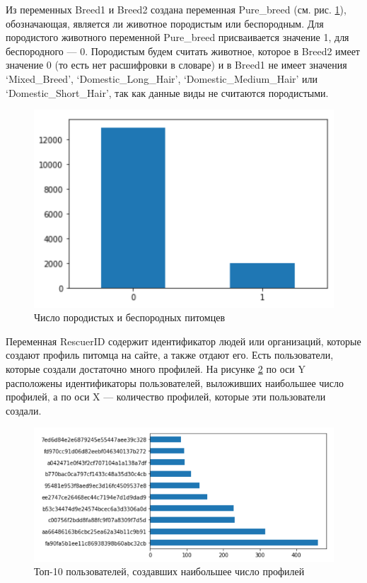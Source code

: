 \documentclass[14pt]{mmcs_article}
\begin{document}
Из переменных Breed1 и Breed2 создана переменная Pure\_breed (см. рис. \ref{analyse:purebreed}), обозначающая, является ли животное породистым или беспородным. Для породистого животного переменной Pure\_breed присваивается значение 1, для беспородного --- 0. Породистым будем считать животное, которое в Breed2 имеет значение 0 (то есть нет расшифровки в словаре) и в Breed1 не имеет значения `Mixed\_Breed', `Domestic\_Long\_Hair', `Domestic\_Medium\_Hair' или `Domestic\_Short\_Hair', так как данные виды не считаются породистыми.

\begin{figure}[H]
	\centering
	\includegraphics[scale=0.9]{purebreed.png}
	\caption{Число породистых и беспородных питомцев}\label{analyse:purebreed}
\end{figure}

Переменная RescuerID содержит идентификатор людей или организаций, которые создают профиль питомца на сайте, а также отдают его. Есть пользователи, которые создали достаточно много профилей. На рисунке \ref{analyse:toprescuer} по оси Y расположены идентификаторы пользователей, выложивших наибольшее число профилей, а по оси X --- количество профилей, которые эти пользователи создали.

\begin{figure}[H]
	\centering
	\includegraphics[scale=1]{toprescuer.png}
	\caption{Топ-10 пользователей, создавших наибольшее число профилей}\label{analyse:toprescuer}
\end{figure}
\end{document}
